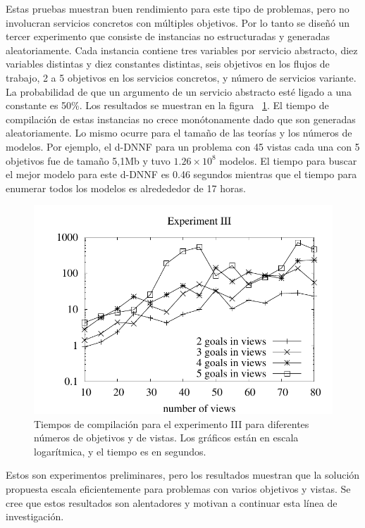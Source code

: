 Estas pruebas muestran buen rendimiento para este tipo de problemas, pero no
involucran servicios concretos con múltiples objetivos. Por lo tanto se
diseñó un tercer experimento que consiste de instancias no estructuradas y
generadas aleatoriamente. Cada instancia contiene tres variables por servicio
abstracto, diez variables distintas y diez constantes distintas, seis
objetivos en los flujos de trabajo, 2 a 5 objetivos en los servicios
concretos, y número de servicios variante. La probabilidad de que un argumento
de un servicio abstracto esté ligado a una constante es 50\%. Los resultados se
muestran en la figura ~\ref{fig:plot3}. El tiempo de compilación de estas instancias no
crece monótonamente dado que son generadas aleatoriamente. Lo mismo ocurre para
el tamaño de las teorías y los números de modelos. Por ejemplo, el d-DNNF para
un problema con 45 vistas cada una con 5 objetivos fue de tamaño 5,1Mb y tuvo
$1.26\times 10^8$ modelos. El tiempo para buscar el mejor modelo para este
d-DNNF es 0.46 segundos mientras que el tiempo para enumerar todos los modelos
es alredededor de 17 horas.

\begin{figure}[t]
\centering
\includegraphics[width=.8\textwidth]{graphics/plot3}
\caption{Tiempos de compilación para el experimento III para diferentes números
de objetivos y de vistas. Los gráficos están en escala logarítmica, y el
tiempo es en segundos.}
\label{fig:plot3}
\end{figure}

Estos son experimentos preliminares, pero los resultados muestran que la
solución propuesta escala eficientemente para problemas con varios objetivos
y vistas. Se cree que estos resultados son alentadores y motivan a continuar
esta línea de investigación.
